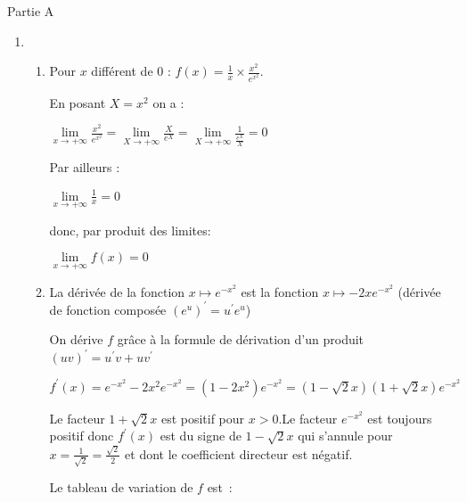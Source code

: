 \begin{corrige}
     \begin{h3}Partie A\end{h3}
     \begin{enumerate}
          \item
          \begin{enumerate}[label=\alph*.]
               \item
               Pour $x$ différent de 0 : $f\left(x\right) = \frac{1}{x}\times \frac{x^{2}}{e^{x^{2}}}$.
               \par
               En posant $X=x^{2}$ on a :
               \par
               $\lim\limits_{x\rightarrow +\infty }\frac{x^{2}}{e^{x^{2}}}=\lim\limits_{X\rightarrow +\infty }\frac{X}{e^{X}}=\lim\limits_{X\rightarrow +\infty }\frac{1}{\frac{e^{X}}{X}}=0$
               \par
               Par ailleurs :
               \par
               $\lim\limits_{x\rightarrow +\infty }\frac{1}{x}=0$
               \par
               donc, par produit des limites:
               \par
               $\lim\limits_{x\rightarrow +\infty }f\left(x\right)=0$
               \item
               La dérivée de la fonction $x\mapsto e^{-x^{2}}$ est la fonction $x\mapsto -2xe^{-x^{2}}$ (dérivée de fonction composée $\left(e^{u}\right)^{\prime}=u^{\prime}e^{u}$)
               \par
               On dérive $f$ grâce à la formule de dérivation d'un produit $\left(uv\right)^{\prime}=u^{\prime}v+uv^{\prime}$
               \par
               $f^{\prime}\left(x\right)=e^{-x^{2}}-2x^{2}e^{-x^{2}}=\left(1-2x^{2}\right)e^{-x^{2}}=\left(1-\sqrt{2}x\right)\left(1+\sqrt{2}x\right)e^{-x^{2}}$
               \par
               Le facteur $1+\sqrt{2}x$ est positif pour $x > 0$.Le facteur $e^{-x^{2}}$ est toujours positif donc $f^{\prime}\left(x\right)$ est du signe de $1-\sqrt{2}x$ qui s'annule pour $x=\frac{1}{\sqrt{2}}=\frac{\sqrt{2}}{2}$ et dont le coefficient directeur est négatif.
               \par
               Le tableau de variation de $f$ est~:

\end{enumerate}
\end{enumerate}
\end{corrige}
